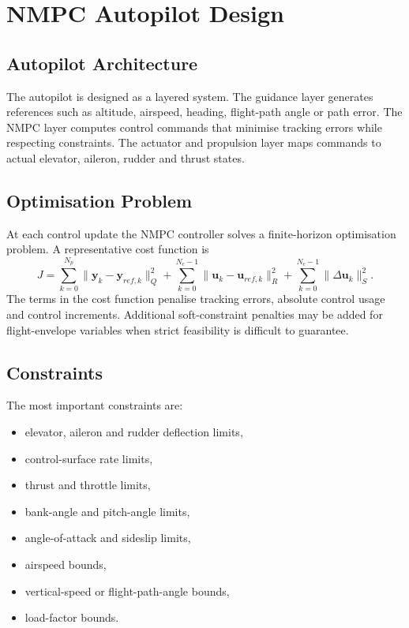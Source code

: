 \chapter{NMPC Autopilot Design}

\section{Autopilot Architecture}

The autopilot is designed as a layered system. The guidance layer generates references such as altitude, airspeed, heading, flight-path angle or path error. The NMPC layer computes control commands that minimise tracking errors while respecting constraints. The actuator and propulsion layer maps commands to actual elevator, aileron, rudder and thrust states.

\section{Optimisation Problem}

At each control update the NMPC controller solves a finite-horizon optimisation problem. A representative cost function is
\begin{equation}
    J = \sum_{k=0}^{N_p} \lVert \bm{y}_k - \bm{y}_{ref,k} \rVert_{Q}^{2}
    + \sum_{k=0}^{N_c-1} \lVert \bm{u}_k - \bm{u}_{ref,k} \rVert_{R}^{2}
    + \sum_{k=0}^{N_c-1} \lVert \Delta \bm{u}_k \rVert_{S}^{2}.
\end{equation}
The terms in the cost function penalise tracking errors, absolute control usage and control increments. Additional soft-constraint penalties may be added for flight-envelope variables when strict feasibility is difficult to guarantee.

\section{Constraints}

The most important constraints are:
\begin{itemize}
    \item elevator, aileron and rudder deflection limits,
    \item control-surface rate limits,
    \item thrust and throttle limits,
    \item bank-angle and pitch-angle limits,
    \item angle-of-attack and sideslip limits,
    \item airspeed bounds,
    \item vertical-speed or flight-path-angle bounds,
    \item load-factor bounds.
\end{itemize}

